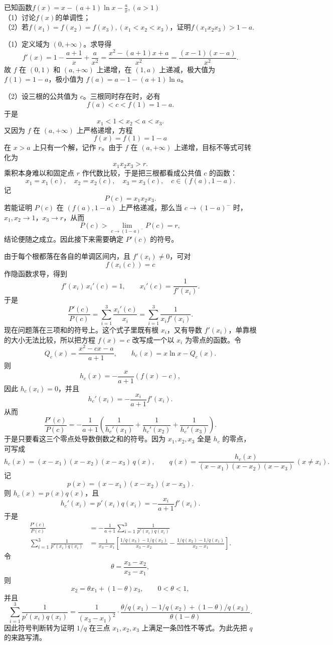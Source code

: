 \begin{example}[导数与零点题]
    已知函数$f(x)=x-(a+1)\ln x-\frac{a}{x},(a>1)$\\
    （1）讨论$f(x)$的单调性；\\
    （2）若$f(x_1)=f(x_2)=f(x_3),(x_1<x_2<x_3)$，证明$f(x_1x_2x_3)>1-a$.
\end{example}
\begin{solution}
（1）定义域为 $(0,+\infty)$。求导得
\[
f'(x)=1-\frac{a+1}x+\frac a{x^2}=\frac{x^2-(a+1)x+a}{x^2}=\frac{(x-1)(x-a)}{x^2}.
\]
故 $f$ 在 $(0,1)$ 和 $(a,+\infty)$ 上递增，在 $(1,a)$ 上递减，极大值为 $f(1)=1-a$，极小值为 $f(a)=a-1-(a+1)\ln a$。

（2）设三根的公共值为 $c$。三根同时存在时，必有
\[
f(a)<c<f(1)=1-a.
\]
于是
\[
x_1<1<x_2<a<x_3.
\]
又因为 $f$ 在 $(a,+\infty)$ 上严格递增，方程
\[
f(x)=f(1)=1-a
\]
在 $x>a$ 上只有一个解，记作 $r$。由于 $f$ 在 $(a,+\infty)$ 上递增，目标不等式可转化为
\[
x_1x_2x_3>r.
\]
乘积本身难以和固定点 $r$ 作代数比较，于是把三根都看成公共值 $c$ 的函数：
\[
x_1=x_1(c),\quad x_2=x_2(c),\quad x_3=x_3(c),\quad c\in(f(a),1-a).
\]
记
\[
P(c)=x_1x_2x_3.
\]
若能证明 $P(c)$ 在 $(f(a),1-a)$ 上严格递减，那么当 $c\to(1-a)^-$ 时，$x_1,x_2\to1$，$x_3\to r$，从而
\[
P(c)>\lim_{c\to(1-a)^-}P(c)=r,
\]
结论便随之成立。因此接下来需要确定 $P'(c)$ 的符号。

由于每个根都落在各自的单调区间内，且 $f'(x_i)\neq 0$，可对
\[
f(x_i(c))=c
\]
作隐函数求导，得到
\[
f'(x_i)\,x_i'(c)=1,\qquad x_i'(c)=\frac{1}{f'(x_i)}.
\]
于是
\[
\frac{P'(c)}{P(c)}=\sum_{i=1}^3\frac{x_i'(c)}{x_i}=\sum_{i=1}^3\frac{1}{x_i f'(x_i)}.
\]
现在问题落在三项和的符号上。这个式子里既有根 $x_i$，又有导数 $f'(x_i)$，单靠根的大小无法比较，所以把方程 $f(x)=c$ 改写成一个以 $x_i$ 为零点的函数。令
\[
Q_c(x)=\frac{x^2-cx-a}{a+1},\qquad h_c(x)=x\ln x-Q_c(x).
\]
则
\[
h_c(x)=-\frac{x}{a+1}(f(x)-c),
\]
因此 $h_c(x_i)=0$，并且
\[
h_c'(x_i)=-\frac{x_i}{a+1}f'(x_i).
\]
从而
\[
\frac{P'(c)}{P(c)}=-\dfrac{1}{a+1}\left(\frac{1}{h_c'(x_1)}+\frac{1}{h_c'(x_2)}+\frac{1}{h_c'(x_3)}\right).
\]
于是只要看这三个零点处导数倒数之和的符号。因为 $x_1,x_2,x_3$ 全是 $h_c$ 的零点，可写成
\[
h_c(x)=(x-x_1)(x-x_2)(x-x_3)\,q(x),\qquad q(x)=\frac{h_c(x)}{(x-x_1)(x-x_2)(x-x_3)}\ (x\neq x_i).
\]
记
\[
p(x)=(x-x_1)(x-x_2)(x-x_3).
\]
则 $h_c(x)=p(x)q(x)$，且
\[
h_c'(x_i)=p'(x_i)q(x_i)=-\frac{x_i}{a+1}f'(x_i).
\]
于是
\begin{align*}
\frac{P'(c)}{P(c)}&=-\frac{1}{a+1}\sum_{i=1}^3\frac{1}{p'(x_i)q(x_i)}\\
\sum_{i=1}^3\frac{1}{p'(x_i)q(x_i)}
&=\frac{1}{x_3-x_1}\left[\frac{1/q(x_3)-1/q(x_2)}{x_3-x_2}-\frac{1/q(x_2)-1/q(x_1)}{x_2-x_1}\right].
\end{align*}
令
\[
\theta=\frac{x_3-x_2}{x_3-x_1},
\]
则
\[
x_2=\theta x_1+(1-\theta)x_3,\qquad 0<\theta<1,
\]
并且
\[
\sum_{i=1}^3\frac{1}{p'(x_i)q(x_i)}
=\frac{1}{(x_3-x_1)^2}\cdot
\frac{\theta/q(x_1)-1/q(x_2)+(1-\theta)/q(x_3)}{\theta(1-\theta)}.
\]
因此符号判断转为证明 $1/q$ 在三点 $x_1,x_2,x_3$ 上满足一条凹性不等式。为此先把 $q$ 的来路写清。


\end{solution}
